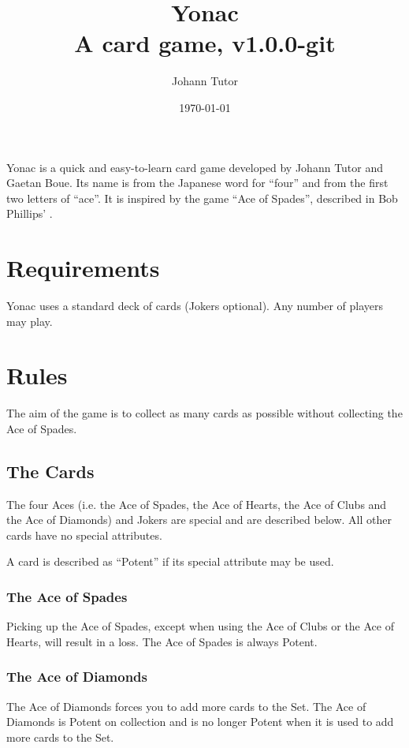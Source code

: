 \documentclass{article}
\newcommand\theversion{1.0.0-git}
\begin{document}
\title{Yonac\\ \large A card game, v\theversion}
\author{Johann Tutor}
\date{\today}
\maketitle

Yonac is a quick and easy-to-learn card game developed by Johann Tutor
and Gaetan Boue. Its name is from the Japanese word for ``four'' and
from the first two letters of ``ace''. It is inspired by the game ``Ace
of Spades'', described in Bob Phillips'
.

\tableofcontents

\newpage

\section{Requirements}

Yonac uses a standard deck of cards (Jokers optional). Any number of
players may play.

\section{Rules}

The aim of the game is to collect as many cards as possible without
collecting the Ace of Spades.

\subsection{The Cards}
\label{sec:cards}

The four Aces (i.e. the Ace of Spades, the Ace of Hearts, the Ace of Clubs and
the Ace of Diamonds) and Jokers are special and are described below. All other
cards have no special attributes.

A card is described as ``Potent'' if its special attribute may be used.

\subsubsection{The Ace of Spades}
Picking up the Ace of Spades, except when using the Ace of Clubs or the
Ace of Hearts, will result in a loss. The Ace of Spades is always Potent.

\subsubsection{The Ace of Diamonds}
The Ace of Diamonds forces you to add more cards to the Set. The Ace of
Diamonds is Potent on collection and is no longer Potent when it is used
to add more cards to the Set.
\end{document}
